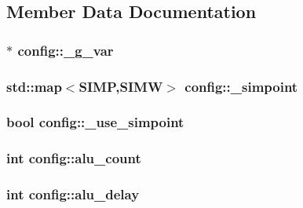 \subsection{Member Data Documentation}
\hypertarget{classconfig_acfc11a499f94cd303747f5e58c447f36}{
\subsubsection[{\_\-g\_\-var}]{$\ast$ {\bf config::\_\-g\_\-var}}}
\label{classconfig_acfc11a499f94cd303747f5e58c447f36}
\hypertarget{classconfig_a66a2268284689ebce8e0fe2f87a2699d}{
\subsubsection[{\_\-simpoint}]{\setlength{\rightskip}{0pt plus 5cm}std::map$<${\bf SIMP},{\bf SIMW}$>$ {\bf config::\_\-simpoint}}}
\label{classconfig_a66a2268284689ebce8e0fe2f87a2699d}
\hypertarget{classconfig_a2928e02fdf4716123e313e363e77875a}{
\subsubsection[{\_\-use\_\-simpoint}]{\setlength{\rightskip}{0pt plus 5cm}bool {\bf config::\_\-use\_\-simpoint}}}
\label{classconfig_a2928e02fdf4716123e313e363e77875a}
\hypertarget{classconfig_a881b8c04dd7ca3bf08cf1bc679608a2e}{
\subsubsection[{alu\_\-count}]{\setlength{\rightskip}{0pt plus 5cm}int {\bf config::alu\_\-count}}}
\label{classconfig_a881b8c04dd7ca3bf08cf1bc679608a2e}
\hypertarget{classconfig_a44f960416e7b458fe0d8c9fb0712d905}{
\subsubsection[{alu\_\-delay}]{\setlength{\rightskip}{0pt plus 5cm}int {\bf config::alu\_\-delay}}}
